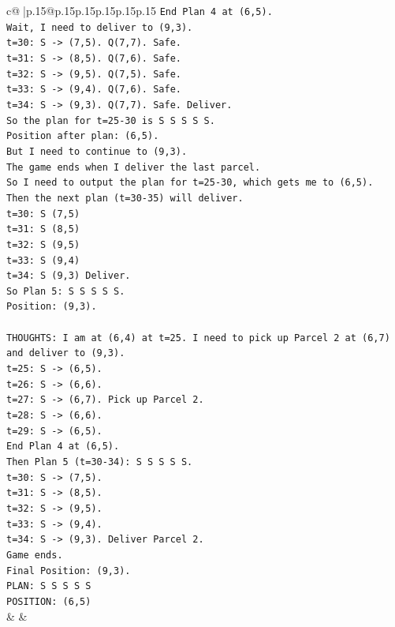 \documentclass{article}
\begin{document}
{\begin{supertabular}{c@{$\;$}|p{.15\linewidth}@{}p{.15\linewidth}p{.15\linewidth}p{.15\linewidth}p{.15\linewidth}p{.15\linewidth}}
{{{\texttt{End Plan 4 at (6,5).} \\
\texttt{Wait, I need to deliver to (9,3).} \\
\texttt{t=30: S {-}> (7,5). Q(7,7). Safe.} \\
\texttt{t=31: S {-}> (8,5). Q(7,6). Safe.} \\
\texttt{t=32: S {-}> (9,5). Q(7,5). Safe.} \\
\texttt{t=33: S {-}> (9,4). Q(7,6). Safe.} \\
\texttt{t=34: S {-}> (9,3). Q(7,7). Safe. Deliver.} \\
\texttt{So the plan for t=25{-}30 is S S S S S.} \\
\texttt{Position after plan: (6,5).} \\
\texttt{But I need to continue to (9,3).} \\
\texttt{The game ends when I deliver the last parcel.} \\
\texttt{So I need to output the plan for t=25{-}30, which gets me to (6,5).} \\
\texttt{Then the next plan (t=30{-}35) will deliver.} \\
\texttt{t=30: S (7,5)} \\
\texttt{t=31: S (8,5)} \\
\texttt{t=32: S (9,5)} \\
\texttt{t=33: S (9,4)} \\
\texttt{t=34: S (9,3) Deliver.} \\
\texttt{So Plan 5: S S S S S.} \\
\texttt{Position: (9,3).} \\
\\ 
\texttt{THOUGHTS: I am at (6,4) at t=25. I need to pick up Parcel 2 at (6,7) and deliver to (9,3).} \\
\texttt{t=25: S {-}> (6,5).} \\
\texttt{t=26: S {-}> (6,6).} \\
\texttt{t=27: S {-}> (6,7). Pick up Parcel 2.} \\
\texttt{t=28: S {-}> (6,6).} \\
\texttt{t=29: S {-}> (6,5).} \\
\texttt{End Plan 4 at (6,5).} \\
\texttt{Then Plan 5 (t=30{-}34): S S S S S.} \\
\texttt{t=30: S {-}> (7,5).} \\
\texttt{t=31: S {-}> (8,5).} \\
\texttt{t=32: S {-}> (9,5).} \\
\texttt{t=33: S {-}> (9,4).} \\
\texttt{t=34: S {-}> (9,3). Deliver Parcel 2.} \\
\texttt{Game ends.} \\
\texttt{Final Position: (9,3).} \\
\texttt{PLAN: S S S S S} \\
\texttt{POSITION: (6,5)} \\
            }
        }
    }
    & & \\ \\


\end{supertabular}}
\end{document}
